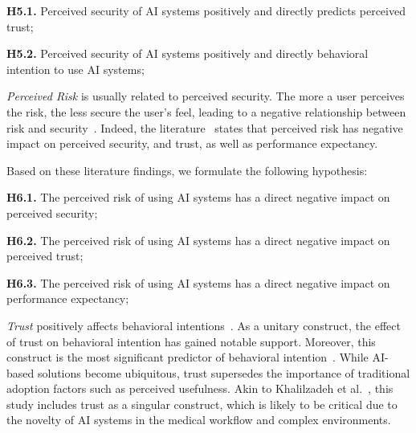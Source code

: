 \vspace{2.00mm}

\noindent
{\bf H5.1.} Perceived security of \ac{AI} systems positively and directly predicts perceived trust;

\vspace{2.00mm}

\noindent
{\bf H5.2.} Perceived security of \ac{AI} systems positively and directly behavioral intention to use \ac{AI} systems;

\vspace{2.00mm}

{\it Perceived Risk} is usually related to perceived security.
The more a user perceives the risk, the less secure the user's feel, leading to a negative relationship between risk and security~\cite{KHALILZADEH2017460}.
Indeed, the literature~\cite{10.1145/3132272.3134111, HART201993} states that perceived risk has negative impact on perceived security, and trust, as well as performance expectancy.

\vspace{2.00mm}

\noindent
Based on these literature findings, we formulate the following hypothesis:

\vspace{2.00mm}

\noindent
{\bf H6.1.} The perceived risk of using \ac{AI} systems has a direct negative impact on perceived security;

\vspace{2.00mm}

\noindent
{\bf H6.2.} The perceived risk of using \ac{AI} systems has a direct negative impact on perceived trust;

\vspace{2.00mm}

\noindent
{\bf H6.3.} The perceived risk of using \ac{AI} systems has a direct negative impact on performance expectancy;

\vspace{2.00mm}

{\it Trust} positively affects behavioral intentions~\cite{HART201993}.
As a unitary construct, the effect of trust on behavioral intention has gained notable support.
Moreover, this construct is the most significant predictor of behavioral intention~\cite{CALISTO2022102922, HART201993}.
While \ac{AI}-based solutions become ubiquitous, trust supersedes the importance of traditional adoption factors such as perceived usefulness.
Akin to Khalilzadeh et al.~\cite{KHALILZADEH2017460}, this study includes trust as a singular construct, which is likely to be critical due to the novelty of \ac{AI} systems in the medical workflow and complex environments.

